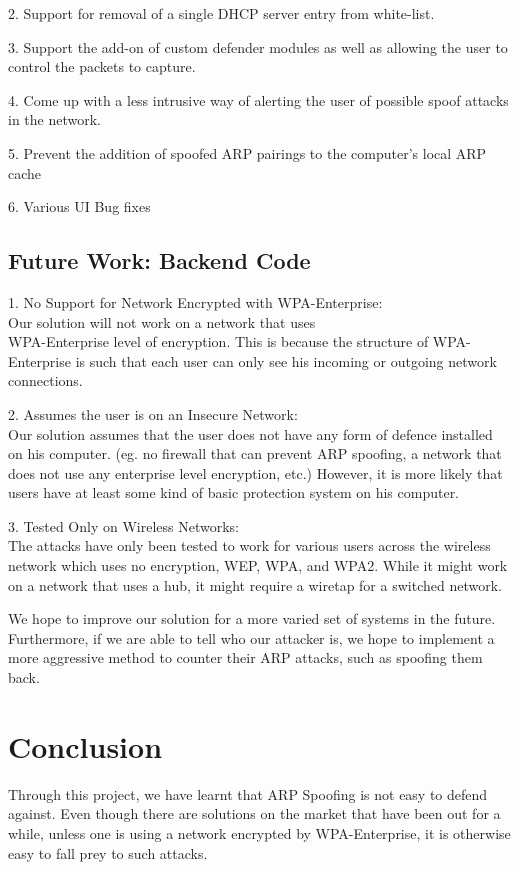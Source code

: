 \documentclass{acm_proc_article-sp}
\begin{document}
2. Support for removal of a single DHCP server entry from white-list.

3. Support the add-on of custom defender modules as well as allowing the user to control the packets to capture.

4. Come up with a less intrusive way of alerting the user of possible spoof attacks in the network.

5. Prevent the addition of spoofed ARP pairings to the computer’s local ARP cache

6. Various UI Bug fixes

\subsection{Future Work: Backend Code}

1. No Support for Network Encrypted with WPA-Enterprise:\\
Our solution will not work on a network that uses\\ WPA-Enterprise level of encryption. This is because the structure of WPA-Enterprise is such that each user can only see his incoming or outgoing network connections. 

2. Assumes the user is on an Insecure Network: \\
Our solution assumes that the user does not have any form of defence installed on his computer. (eg. no firewall that can prevent ARP spoofing, a network that does not use any enterprise level encryption, etc.) However, it is more likely that users have at least some kind of basic protection system on his computer. 

3. Tested Only on Wireless Networks:\\
The attacks have only been tested to work for various users across the wireless network which uses no encryption, WEP, WPA, and WPA2. While it might work on a network that uses a hub, it might require a wiretap for a switched network.  

We hope to improve our solution for a more varied set of systems in the future. Furthermore, if we are able to tell who our attacker is, we hope to implement a more aggressive method to counter their ARP attacks, such as spoofing them back. 

\section{Conclusion}
Through this project, we have learnt that ARP Spoofing is not easy to defend against. Even though there are solutions on the market that have been out for a while, unless one is using a network encrypted by WPA-Enterprise, it is otherwise easy to fall prey to such attacks. 
\end{document}
